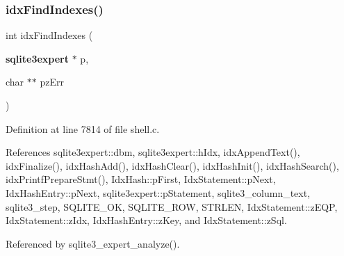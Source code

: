 \subsubsection{idx\+Find\+Indexes()}
{\footnotesize\ttfamily int idx\+Find\+Indexes (\begin{DoxyParamCaption}\item[{\textbf{ sqlite3expert} $\ast$}]{p,  }\item[{char $\ast$$\ast$}]{pz\+Err }\end{DoxyParamCaption})}



Definition at line 7814 of file shell.\+c.



References sqlite3expert\+::dbm, sqlite3expert\+::h\+Idx, idx\+Append\+Text(), idx\+Finalize(), idx\+Hash\+Add(), idx\+Hash\+Clear(), idx\+Hash\+Init(), idx\+Hash\+Search(), idx\+Printf\+Prepare\+Stmt(), Idx\+Hash\+::p\+First, Idx\+Statement\+::p\+Next, Idx\+Hash\+Entry\+::p\+Next, sqlite3expert\+::p\+Statement, sqlite3\+\_\+column\+\_\+text, sqlite3\+\_\+step, S\+Q\+L\+I\+T\+E\+\_\+\+OK, S\+Q\+L\+I\+T\+E\+\_\+\+R\+OW, S\+T\+R\+L\+EN, Idx\+Statement\+::z\+E\+QP, Idx\+Statement\+::z\+Idx, Idx\+Hash\+Entry\+::z\+Key, and Idx\+Statement\+::z\+Sql.



Referenced by sqlite3\+\_\+expert\+\_\+analyze().


